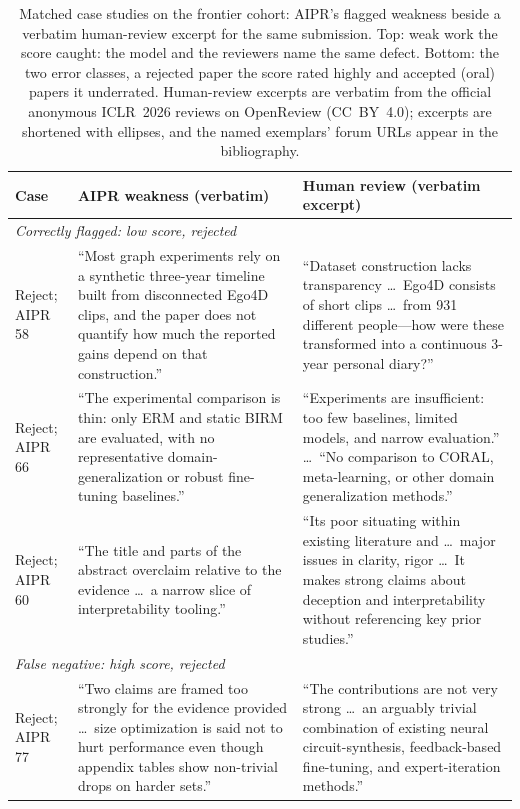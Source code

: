 \begin{table}[h]
  \centering
  \footnotesize
  \caption{Matched case studies on the frontier cohort: AIPR's flagged weakness
  beside a verbatim human-review excerpt for the same submission. Top: weak work the
  score caught: the model and the reviewers name the same defect. Bottom: the two
  error classes, a rejected paper the score rated highly and accepted (oral) papers
  it underrated. Human-review excerpts are verbatim from the official anonymous
  ICLR~2026 reviews on OpenReview (CC~BY~4.0); excerpts are shortened with ellipses,
  and the named exemplars' forum URLs appear in the bibliography.}
  \label{tab:casestudy}
  \begin{tabular}{p{}p{}p{}}
    \toprule
    Case & AIPR weakness (verbatim) & Human review (verbatim excerpt) \\
    \midrule
    \multicolumn{3}{l}{\emph{Correctly flagged: low score, rejected}}\\[2pt]
    Reject; AIPR 58 & ``Most graph experiments rely on a synthetic three-year timeline built from disconnected Ego4D clips, and the paper does not quantify how much the reported gains depend on that construction.'' & ``Dataset construction lacks transparency \ldots\ Ego4D consists of short clips \ldots\ from 931 different people---how were these transformed into a continuous 3-year personal diary?'' \\[3pt]
    Reject; AIPR 66 & ``The experimental comparison is thin: only ERM and static BIRM are evaluated, with no representative domain-generalization or robust fine-tuning baselines.'' & ``Experiments are insufficient: too few baselines, limited models, and narrow evaluation.'' \ldots\ ``No comparison to CORAL, meta-learning, or other domain generalization methods.'' \\[3pt]
    Reject; AIPR 60 & ``The title and parts of the abstract overclaim relative to the evidence \ldots\ a narrow slice of interpretability tooling.'' & ``Its poor situating within existing literature and \ldots\ major issues in clarity, rigor \ldots\ It makes strong claims about deception and interpretability without referencing key prior studies.'' \\
    \midrule
    \multicolumn{3}{l}{\emph{False negative: high score, rejected}}\\[2pt]
    Reject; AIPR 77 & ``Two claims are framed too strongly for the evidence provided \ldots\ size optimization is said not to hurt performance even though appendix tables show non-trivial drops on harder sets.'' & ``The contributions are not very strong \ldots\ an arguably trivial combination of existing neural circuit-synthesis, feedback-based fine-tuning, and expert-iteration methods.'' \\

\end{tabular}
\end{table}
